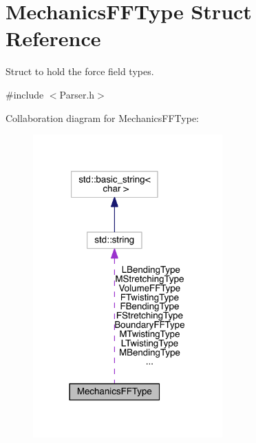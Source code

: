 \hypertarget{structMechanicsFFType}{\section{Mechanics\+F\+F\+Type Struct Reference}
\label{structMechanicsFFType}
}


Struct to hold the force field types.  




{\ttfamily \#include $<$Parser.\+h$>$}



Collaboration diagram for Mechanics\+F\+F\+Type\+:\nopagebreak
\begin{figure}[H]
\begin{center}
\leavevmode
\includegraphics[width=206pt]{structMechanicsFFType__coll__graph}
\end{center}
\end{figure}
